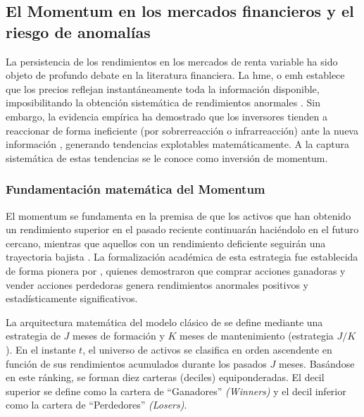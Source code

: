 \documentclass[
]{article}
\begin{document}
	\subsection{El Momentum en los mercados financieros y el riesgo de
		anomalías}\label{el-momentum-en-los-mercados-financieros-y-el-riesgo-de-anomaluxedas}
	
	La persistencia de los rendimientos en los mercados de renta variable ha
	sido objeto de profundo debate en la literatura financiera. La \gls{hme}, o \gls{emh} establece que los precios reflejan
	instantáneamente toda la información disponible, imposibilitando la
	obtención sistemática de rendimientos anormales \parencite{fama1970}. Sin embargo, la
	evidencia empírica ha demostrado que los inversores tienden a reaccionar
	de forma ineficiente (por sobrerreacción o infrarreacción) ante la nueva
	información \parencite{barberis1998, hong1999}, generando tendencias explotables matemáticamente. A la
	captura sistemática de estas tendencias se le conoce como inversión de
	\gls{momentum}.
	
	\subsubsection{\texorpdfstring{Fundamentación matemática del Momentum
		}{Fundamentación matemática del Momentum }}\label{fundamentaciuxf3n-matemuxe1tica-del-momentum}
	
	El \gls{momentum} se fundamenta en la premisa de que los activos que
	han obtenido un rendimiento superior en el pasado reciente continuarán
	haciéndolo en el futuro cercano, mientras que aquellos con un
	rendimiento deficiente seguirán una trayectoria bajista \parencite{carhart1997}. La
	formalización académica de esta estrategia fue establecida de forma
	pionera por \textcite{jegadeesh1993}, quienes demostraron que comprar acciones
	ganadoras y vender acciones perdedoras genera rendimientos anormales
	positivos y estadísticamente significativos.
	
	La arquitectura matemática del modelo clásico de \textcite{jegadeesh1993} se
	define mediante una estrategia de \(J\) meses de formación y \(K\) meses
	de mantenimiento (estrategia \(J\text{/}K\)). En el instante \(t\), el
	universo de activos se clasifica en orden ascendente en función de sus
	rendimientos acumulados durante los pasados \(J\) meses. Basándose en
	este ránking, se forman diez carteras (deciles) equiponderadas. El decil
	superior se define como la cartera de ``Ganadores'' \emph{(Winners)} y el decil
	inferior como la cartera de ``Perdedores'' \emph{(Losers)}.
	
\end{document}
